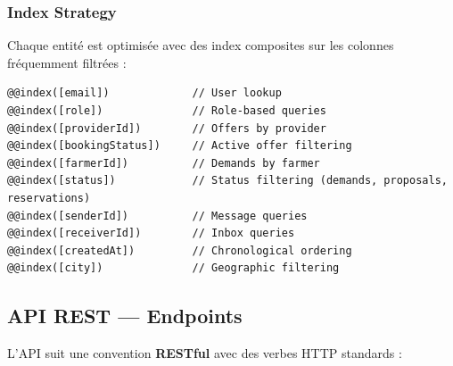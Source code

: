 \documentclass[12pt, a4paper]{article}
\begin{document}
\subsubsection{Index Strategy}

Chaque entité est optimisée avec des index composites sur les colonnes fréquemment filtrées :

\begin{lstlisting}[caption=Exemples d'index dans schema.prisma]
@@index([email])             // User lookup
@@index([role])              // Role-based queries
@@index([providerId])        // Offers by provider
@@index([bookingStatus])     // Active offer filtering
@@index([farmerId])          // Demands by farmer
@@index([status])            // Status filtering (demands, proposals, reservations)
@@index([senderId])          // Message queries
@@index([receiverId])        // Inbox queries
@@index([createdAt])         // Chronological ordering
@@index([city])              // Geographic filtering
\end{lstlisting}

\subsection{API REST — Endpoints}

L'API suit une convention \textbf{RESTful} avec des verbes HTTP standards :
\end{document}
